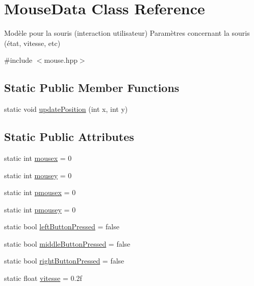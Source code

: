 \hypertarget{class_mouse_data}{}\section{Mouse\+Data Class Reference}
\label{class_mouse_data}


Modèle pour la souris (interaction utilisateur) Paramètres concernant la souris (état, vitesse, etc)  




{\ttfamily \#include $<$mouse.\+hpp$>$}

\subsection*{Static Public Member Functions}
\begin{DoxyCompactItemize}
\item 
static void \hyperlink{class_mouse_data_aee9c88eaf22f3ca6dce4d12ac60604b3}{update\+Position} (int x, int y)
\end{DoxyCompactItemize}
\subsection*{Static Public Attributes}
\begin{DoxyCompactItemize}
\item 
static int \hyperlink{class_mouse_data_a97eb3138f2f52f859b0d16e683d8cfcb}{mousex} = 0
\item 
static int \hyperlink{class_mouse_data_aea43f059e0ff26829a0a8d8619b3f18c}{mousey} = 0
\item 
static int \hyperlink{class_mouse_data_a7694431e993365b4817ff2e9ac161555}{pmousex} = 0
\item 
static int \hyperlink{class_mouse_data_a35be8fdf24f27e0de5ba01e44bd6eb33}{pmousey} = 0
\item 
static bool \hyperlink{class_mouse_data_a0aba8d6075bdc8237efa484ffaeae14a}{left\+Button\+Pressed} = false
\item 
static bool \hyperlink{class_mouse_data_a00962824d35b75221cc3198467cc8907}{middle\+Button\+Pressed} = false
\item 
static bool \hyperlink{class_mouse_data_a224b54f7b421bdb8443133db38c1ae4b}{right\+Button\+Pressed} = false
\item 
static float \hyperlink{class_mouse_data_a86d3b28c7d10597467bb0288e6863941}{vitesse} = 0.\+2f
\end{DoxyCompactItemize}


